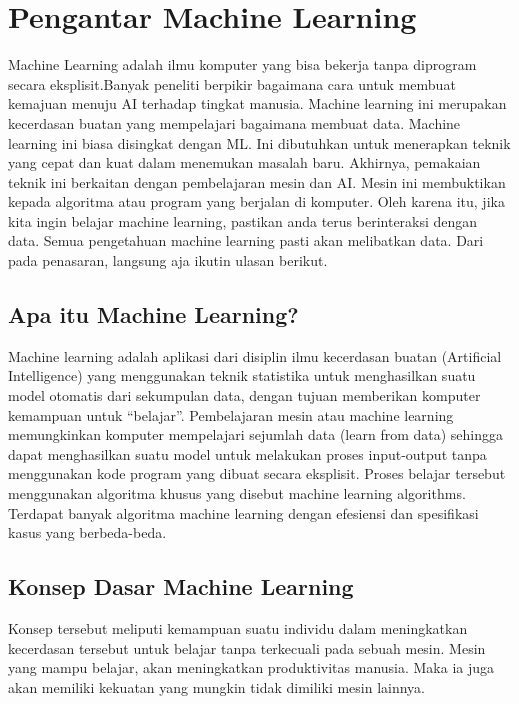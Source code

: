 \section{Pengantar Machine Learning}
Machine Learning adalah ilmu komputer yang bisa bekerja tanpa diprogram secara eksplisit.Banyak peneliti berpikir bagaimana cara untuk membuat kemajuan menuju AI terhadap tingkat manusia. Machine learning ini merupakan kecerdasan buatan yang mempelajari bagaimana membuat data. Machine learning ini biasa disingkat dengan ML. Ini dibutuhkan untuk menerapkan teknik yang cepat dan kuat dalam menemukan masalah baru.
Akhirnya, pemakaian teknik ini berkaitan dengan pembelajaran mesin dan AI. Mesin ini membuktikan kepada algoritma atau program yang berjalan di komputer. Oleh karena itu, jika kita ingin belajar machine learning, pastikan anda terus berinteraksi dengan data. Semua pengetahuan machine learning pasti akan melibatkan data. Dari pada penasaran, langsung aja ikutin ulasan berikut.
\subsection{Apa itu Machine Learning?}
Machine learning adalah aplikasi dari disiplin ilmu kecerdasan buatan (Artificial Intelligence) yang menggunakan teknik statistika untuk menghasilkan suatu model otomatis dari sekumpulan data, dengan tujuan memberikan komputer kemampuan untuk “belajar”. Pembelajaran mesin atau machine learning memungkinkan komputer mempelajari sejumlah data (learn from data) sehingga dapat menghasilkan suatu model untuk melakukan proses input-output tanpa menggunakan kode program yang dibuat secara eksplisit. Proses belajar tersebut menggunakan algoritma khusus yang disebut machine learning algorithms. Terdapat banyak algoritma machine learning dengan efesiensi dan spesifikasi kasus yang berbeda-beda.
\subsection {Konsep Dasar Machine Learning}
Konsep tersebut meliputi kemampuan suatu individu dalam meningkatkan kecerdasan tersebut untuk belajar tanpa terkecuali pada sebuah mesin. Mesin yang mampu belajar, akan meningkatkan produktivitas manusia. Maka ia juga akan memiliki kekuatan yang mungkin tidak dimiliki mesin lainnya.
